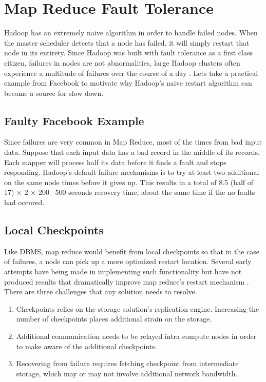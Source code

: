 \documentclass[10pt,twocolumn]{IEEEtran11}
\begin{document}
\section{Map Reduce Fault Tolerance}

Hadoop has an extremely naive algorithm in order to handle failed nodes.   When the master scheduler detects that a node has failed, it will simply restart that node in its entirety.  Since Hadoop was built with fault tolerance as a first class citizen, failures in nodes are not abnormalities, large Hadoop clusters often experience a multitude of  failures over the course of a day  \cite{bibid}.  Lets take a practical example from Facebook to motivate why Hadoop's naive restart algorithm can become a source for slow down.

\subsection{Faulty Facebook Example}

Since failures are very common in Map Reduce, most of the times from bad input data.  Suppose that each input data has a bad record in the middle of its records.  Each mapper will process half its data before it finds a fault and stops responding.  Hadoop's default failure mechanisms is to try at least two additional on the same node times before it gives up.  This results in a total of 8.5 (half of 17) × 2 × 200 ~500 seconds recovery time, about the same time if the no faults had occured.

\subsection{Local Checkpoints}

Like DBMS, map reduce would benefit from local checkpoints so that in the case of failures, a node can pick up a more optimized restart location.  Several early attempts have being made in implementing such functionality but have not produced results that dramatically improve map reduce's restart mechanism \cite{yang2010osprey}.  There are three challenges that any solution needs to resolve.
\  \\
\begin{enumerate}
	\setlength\itemsep{1em}
	\item Checkpoints relies on the storage solution's replication engine.  Increasing the number of checkpoints places additional strain on the storage.
	\item Additional communication needs to be relayed intra compute nodes in order to make aware of the additional checkpoints.
	\item Recovering from failure requires fetching checkpoint from intermediate storage, which may or may not involve additional network bandwidth.
\end{enumerate}
\end{document}
